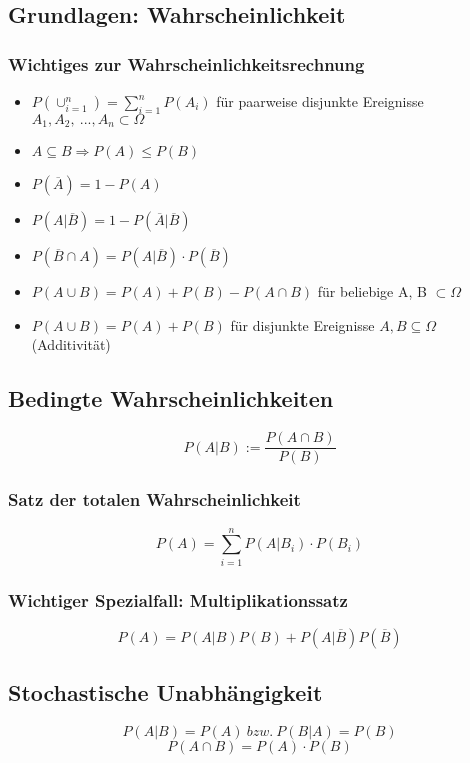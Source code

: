 \documentclass[10pt,a4paper,landscape]{article}
\begin{document}
\begin{multicols}{4}
\section{Grundlagen: Wahrscheinlichkeit}

\subsubsection*{Wichtiges zur Wahrscheinlichkeitsrechnung}
\begin{itemize}
\item $P(\cup _{i=1} ^{n}) = \sum_{i=1}^n P(A_i)$ für paarweise disjunkte Ereignisse $A_1, A_2, ~..., A_n \subset \Omega$
\item $A \subseteq B \Rightarrow P(A) \leqslant P(B)$
\item \(P (\overline{A}) = 1 - P(A)\)
\item $P(A|\overline{B})= 1 - P(\overline{A} |\overline{B})$
\item $P(\overline{B}\cap A)=P(A|\overline{B})\cdot P(\overline{B})$
\item $P(A\cup B) = P(A) + P(B) -P(A\cap B)$ für beliebige A, B $\subset \Omega$
\item $P(A \cup B) = P(A) + P(B)$ für disjunkte Ereignisse $A,B \subseteq \Omega$ (Additivität)
\end{itemize}

\subsection{Bedingte Wahrscheinlichkeiten}
\[
P(A|B) := \frac{P(A\cap B)}{P(B)}
\]

\subsubsection*{Satz der totalen Wahrscheinlichkeit}
\[
P(A)=\sum_{i=1}^n P(A|B_i) \cdot P(B_i)
\]

\subsubsection*{Wichtiger Spezialfall: Multiplikationssatz}
\[
P(A)=P(A|B)P(B)+P(A|\overline{B})P(\overline{B})
\]

\subsection{Stochastische Unabhängigkeit}
\[
P(A|B) = P(A) ~bzw.~ P(B|A)=P(B)
\]
\[
P(A \cap B)=P(A) \cdot P(B)
\]


\end{multicols}
\end{document}
